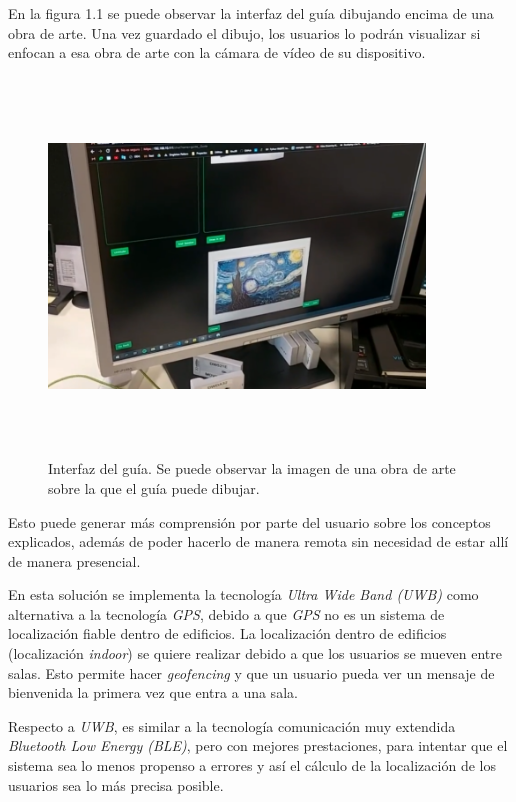 En la figura 1.1 se puede observar la interfaz del guía dibujando encima de una obra de arte. Una vez guardado el dibujo, los usuarios lo podrán visualizar si enfocan a esa obra de arte con la cámara de vídeo de su dispositivo.
\FloatBarrier
\begin{figure}[h]
    \centering
    \includegraphics[width=10cm,height=10cm,keepaspectratio]{img/guide drawing.png}
    \caption{Interfaz del guía. Se puede observar la imagen de una obra de arte sobre la que el guía puede dibujar.}
    \label{fig:exmaple_guide drawing}
\end{figure}
\FloatBarrier
Esto puede generar más comprensión por parte del usuario sobre los conceptos explicados, además de poder hacerlo de manera remota sin necesidad de estar allí de manera presencial.


En esta solución se implementa la tecnología \textit{Ultra Wide Band (UWB)} como alternativa a la tecnología \textit{GPS}, debido a que \textit{GPS} no es un sistema de localización fiable dentro de edificios. La localización dentro de edificios (localización \textit{indoor}) se quiere realizar debido a que los usuarios se mueven entre salas. Esto permite hacer \textit{geofencing} y que un usuario pueda ver un mensaje de bienvenida la primera vez que entra a una sala.

Respecto a \textit{UWB}, es similar a la tecnología comunicación muy extendida \textit{Bluetooth Low Energy (BLE)}, pero con mejores prestaciones, para intentar que el sistema sea lo menos propenso a errores y así el cálculo de la localización de los usuarios sea lo más precisa posible. 

